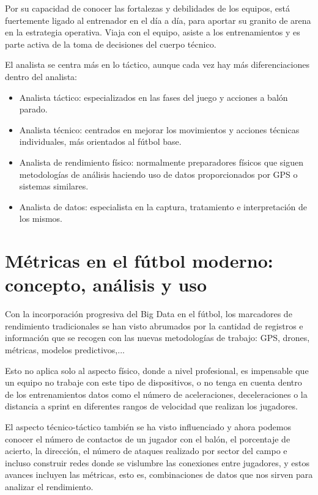 Por su capacidad de conocer las fortalezas y debilidades de 
los equipos, está fuertemente ligado al entrenador en el 
día a día, para aportar su granito de arena en la estrategia 
operativa. Viaja con el equipo, asiste a los entrenamientos 
y es parte activa de la toma de decisiones del cuerpo técnico.

El analista se centra más en lo táctico, aunque cada vez hay 
más diferenciaciones dentro del analista:

\begin{itemize}
    \item Analista táctico: especializados en las fases del juego y acciones 
    a balón parado.
    \item Analista técnico: centrados en mejorar los movimientos y acciones 
    técnicas individuales, más orientados al fútbol base.
    \item Analista de rendimiento físico: normalmente preparadores físicos 
    que siguen metodologías de análisis haciendo uso de datos 
    proporcionados por GPS o sistemas similares.
    \item Analista de datos: especialista en la captura, tratamiento e 
    interpretación de los mismos.
\end{itemize}

\section{Métricas en el fútbol moderno: concepto, análisis y uso}
Con la incorporación progresiva del Big Data en el fútbol, 
los marcadores de rendimiento tradicionales se han visto 
abrumados por la cantidad de registros e información que 
se recogen con las nuevas metodologías de trabajo: GPS, drones, 
métricas, modelos predictivos,...

Esto no aplica solo al aspecto físico, donde a nivel profesional, 
es impensable que un equipo no trabaje con este tipo de dispositivos, 
o no tenga en cuenta dentro de los entrenamientos datos como el 
número de aceleraciones, deceleraciones o la distancia a sprint 
en diferentes rangos de velocidad que realizan los jugadores.

El aspecto técnico-táctico también se ha visto influenciado y 
ahora podemos conocer el número de contactos de un jugador con 
el balón, el porcentaje de acierto, la dirección, el número de 
ataques realizado por sector del campo e incluso construir 
redes donde se vislumbre las conexiones entre jugadores, y 
estos avances incluyen las métricas, esto es, combinaciones de datos 
que nos sirven para analizar el rendimiento.

